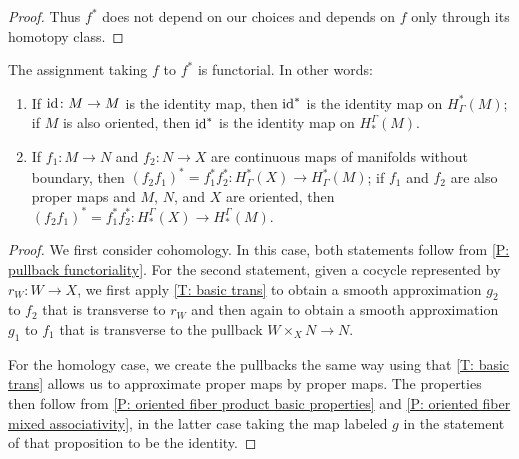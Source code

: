 \begin{proof}
	Thus $f^*$ does not depend on our choices and depends on $f$ only through its homotopy class.
\end{proof}

\begin{corollary}\label{C: contra funct}
	The assignment taking $f$ to $f^*$ is functorial.
	In other words:
		\begin{enumerate}
			\item If $\mathrm{id} \colon M \to M$ is the identity map, then $\mathrm{id}^*$ is the identity map on $H^*_\Gamma(M)$; if $M$ is also oriented, then $\mathrm{id}^*$ is the identity map on $H_*^\Gamma(M)$.
			\item If $f_1 \colon M \to N$ and $f_2 \colon N \to X$ are continuous maps of manifolds without boundary, then $(f_2f_1)^* = f_1^*f_2^* \colon H^*_\Gamma(X) \to H^*_\Gamma(M)$; if $f_1$ and $f_2$ are also proper maps and $M$, $N$, and $X$ are oriented, then $(f_2f_1)^* = f_1^*f_2^* \colon H_*^\Gamma(X) \to H_*^\Gamma(M)$.
		\end{enumerate}
\end{corollary}
\begin{proof}
	We first consider cohomology.
	In this case, both statements follow from \cref{P: pullback functoriality}.
	For the second statement, given a cocycle represented by $r_W \colon W \to X$, we first apply \cref{T: basic trans} to obtain a smooth approximation $g_2$ to $f_2$ that is transverse to $r_W$ and then again to obtain a smooth approximation $g_1$ to $f_1$ that is transverse to the pullback $W \times_X N \to N$.

	For the homology case, we create the pullbacks the same way using that \cref{T: basic trans} allows us to approximate proper maps by proper maps.
	The properties then follow from \cref{P: oriented fiber product basic properties} and \cref{P: oriented fiber mixed associativity}, in the latter case taking the map labeled $g$ in the statement of that proposition to be the identity.
\end{proof}

